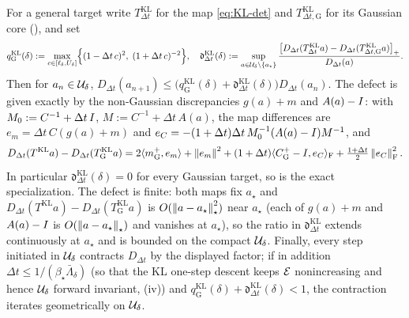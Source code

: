 \begin{proposition}
\label{prop:kl-general}
For a general target write $T_{\Delta t}^{\mathrm{KL}}$ for the map \eqref{eq:KL-det} and
$T_{\Delta t,\mathrm G}^{\mathrm{KL}}$ for its Gaussian core (), and set
\[
    q_{\mathrm G}^{\mathrm{KL}}(\delta):=\max_{c\in[\ell_\delta,U_\delta]}\Bigl\{(1-\Delta t\,c)^2,\;(1+\Delta t\,c)^{-2}\Bigr\},
    \quad
    \mathfrak d_{\Delta t}^{\mathrm{KL}}(\delta):=\sup_{a\in\mathcal{U}_\delta\setminus\{a_\star\}}
    \frac{\bigl[D_{\Delta t}(T_{\Delta t}^{\mathrm{KL}}a)-D_{\Delta t}(T_{\Delta t,\mathrm G}^{\mathrm{KL}}a)\bigr]_+}{D_{\Delta t}(a)} .
\]
Then for $a_n\in\mathcal{U}_\delta$,
$D_{\Delta t}(a_{n+1})\leq\bigl(q_{\mathrm G}^{\mathrm{KL}}(\delta)+\mathfrak d_{\Delta t}^{\mathrm{KL}}(\delta)\bigr)D_{\Delta t}(a_n)$.
The defect is given exactly by the non-Gaussian discrepancies
$g(a)+m$ and $A(a)-I$: with $M_0:=C^{-1}+\Delta t\,I$, $M:=C^{-1}+\Delta t\,A(a)$, the map
differences are $e_m=\Delta t\,C(g(a)+m)$ and
$e_C=-(1+\Delta t)\Delta t\,M_0^{-1}(A(a)-I)M^{-1}$, and
\[
    D_{\Delta t}(T^{\mathrm{KL}}a)-D_{\Delta t}(T_{\mathrm G}^{\mathrm{KL}}a)
    =2\langle m_{\mathrm G}^+,e_m\rangle+\left\lVert e_m\right\rVert^2
    +(1+\Delta t)\langle C_{\mathrm G}^+-I,e_C\rangle_{\mathrm{F}}+\tfrac{1+\Delta t}2\left\lVert e_C\right\rVert_{\mathrm{F}}^2 .
\]
In particular $\mathfrak d_{\Delta t}^{\mathrm{KL}}(\delta)=0$ for every Gaussian target, so
 is the exact specialization. The defect is finite: both maps fix
$a_\star$ and $D_{\Delta t}(T^{\mathrm{KL}}a)-D_{\Delta t}(T_{\mathrm G}^{\mathrm{KL}}a)$ is
$O(\left\lVert a-a_\star\right\rVert_\star^2)$ near $a_\star$ (each of $g(a)+m$ and $A(a)-I$ is
$O(\left\lVert a-a_\star\right\rVert_\star)$ and vanishes at $a_\star$), so the ratio in
$\mathfrak d_{\Delta t}^{\mathrm{KL}}$ extends continuously at $a_\star$ and is bounded on the
compact $\mathcal{U}_\delta$. Finally, every step initiated in $\mathcal{U}_\delta$ contracts
$D_{\Delta t}$ by the displayed factor; if in addition
$\Delta t\leq1/(\beta_\star\bar\Lambda_\delta)$ (so that the KL one-step descent keeps
$\mathcal{E}$ nonincreasing and hence $\mathcal{U}_\delta$ forward invariant,
(iv)) and
$q_{\mathrm G}^{\mathrm{KL}}(\delta)+\mathfrak d_{\Delta t}^{\mathrm{KL}}(\delta)<1$, the
contraction iterates geometrically on $\mathcal{U}_\delta$.
\end{proposition}

